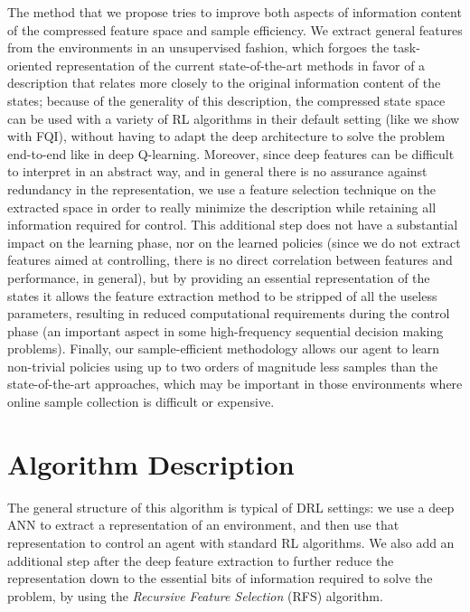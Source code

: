 The method that we propose tries to improve both aspects of information content
of the compressed feature space and sample efficiency. We extract general 
features from the environments in an unsupervised fashion, which forgoes the
task-oriented representation of the current state-of-the-art methods in favor of
a description that relates more closely to the original information content of 
the states; because of the generality of this description, the compressed state 
space can be used with a variety of RL algorithms in their default setting (like
we show with FQI), without having to adapt the deep architecture to solve the 
problem end-to-end like in deep Q-learning.
Moreover, since deep features can be difficult to interpret in an abstract 
way, and in general there is no assurance against redundancy in the 
representation, we use a feature selection technique on the extracted space in 
order to really minimize the description while retaining all information 
required for control. 
This additional step does not have a substantial impact on the learning phase, 
nor on the learned policies (since we do not extract features aimed at 
controlling, there is no direct correlation between features and performance, in
general), but by providing an essential representation of the states it allows
the feature extraction method to be stripped of all the useless parameters, 
resulting in reduced computational requirements during the control phase (an 
important aspect in some high-frequency sequential decision making problems).
Finally, our sample-efficient methodology allows our agent to learn non-trivial 
policies using up to two orders of magnitude less samples than the 
state-of-the-art approaches, which may be important in those environments where 
online sample collection is difficult or expensive.

\section{Algorithm Description} \label{s:main_alg}
The general structure of this algorithm is typical of DRL settings: we use a 
deep ANN to extract a representation of an environment, and then use that 
representation to control an agent with standard RL algorithms. We also add an 
additional step after the deep feature extraction to further reduce the 
representation down to the essential bits of information required to solve the 
problem, by using the \textit{Recursive Feature Selection} (RFS) 
\cite{castelletti2011tree} algorithm.

